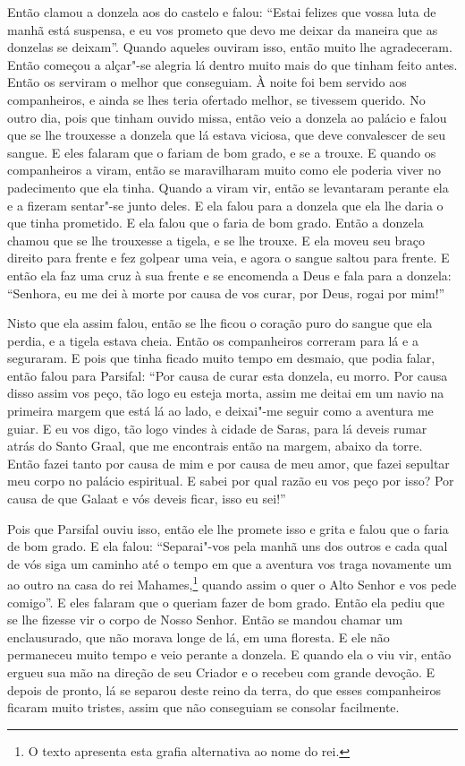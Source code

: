 Então clamou a donzela aos do castelo e falou: ``Estai felizes que vossa luta de
manhã está suspensa, e eu vos prometo que devo me deixar da maneira que as
donzelas se deixam”. Quando aqueles ouviram isso, então muito lhe agradeceram.
Então começou a alçar"-se alegria lá dentro muito mais do que tinham feito antes.
Então os serviram o melhor que conseguiam. À noite foi bem servido aos
companheiros, e ainda se lhes teria ofertado melhor, se tivessem querido. No
outro dia, pois que tinham ouvido missa, então veio a donzela ao palácio e
falou que se lhe trouxesse a donzela que lá estava viciosa, que deve
convalescer de seu sangue. E eles falaram que o fariam de bom grado, e se a
trouxe. E quando os companheiros a viram, então se maravilharam muito como ele
poderia viver no padecimento que ela tinha. Quando a viram vir, então se
levantaram perante ela e a fizeram sentar"-se junto deles. E ela falou para a
donzela que ela lhe daria o que tinha prometido. E ela falou que o faria de bom
grado. Então a donzela chamou que se lhe trouxesse a tigela, e se lhe trouxe. E
ela moveu seu braço direito para frente e fez golpear uma veia, e agora o
sangue saltou para frente. E então ela faz uma cruz à sua frente e se encomenda
a Deus e fala para a donzela: “Senhora, eu me dei à morte por causa de vos
curar, por Deus, rogai por mim!”

Nisto que ela assim falou, então se lhe ficou o coração puro do sangue que ela
perdia, e a tigela estava cheia. Então os companheiros correram para lá e a
seguraram. E pois que tinha ficado muito tempo em desmaio, que podia falar,
então falou para Parsifal: “Por causa de curar esta donzela, eu morro. Por
causa disso assim vos peço, tão logo eu esteja morta, assim me deitai em um
navio na primeira margem que está lá ao lado, e deixai"-me seguir como a
aventura me guiar. E eu vos digo, tão logo vindes à cidade de Saras, para lá
deveis rumar atrás do Santo Graal, que me encontrais então na margem, abaixo da
torre. Então fazei tanto por causa de mim e por causa de meu amor, que fazei
sepultar meu corpo no palácio espiritual. E sabei por qual razão eu vos peço
por isso? Por causa de que Galaat e vós deveis ficar, isso eu sei!”

Pois que Parsifal ouviu isso, então ele lhe promete isso e grita e falou que o
faria de bom grado. E ela falou: “Separai"-vos pela manhã uns dos outros e cada
qual de vós siga um caminho até o tempo em que a aventura vos traga novamente
um ao outro na casa do rei Mahames,\footnote{ O texto apresenta
esta grafia alternativa ao nome do rei.}  quando assim o quer o
Alto Senhor e vos pede comigo”. E eles falaram que o queriam fazer de bom
grado. Então ela pediu que se lhe fizesse vir o corpo de Nosso Senhor. Então se
mandou chamar um enclausurado, que não morava longe de lá, em uma floresta. E
ele não permaneceu muito tempo e veio perante a donzela. E quando ela o viu
vir, então ergueu sua mão na direção de seu Criador e o recebeu com grande
devoção. E depois de pronto, lá se separou deste reino da terra, do que esses
companheiros ficaram muito tristes, assim que não conseguiam se consolar
facilmente.

